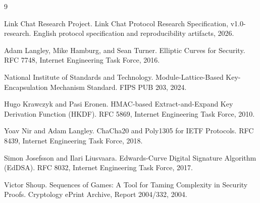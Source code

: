 \documentclass[11pt,letterpaper]{article}
\begin{document}
\begin{thebibliography}{9}

Link Chat Research Project.
\newblock Link Chat Protocol Research Specification, v1.0-research.
\newblock English protocol specification and reproducibility artifacts, 2026.

Adam Langley, Mike Hamburg, and Sean Turner.
\newblock Elliptic Curves for Security.
\newblock RFC 7748, Internet Engineering Task Force, 2016.

National Institute of Standards and Technology.
\newblock Module-Lattice-Based Key-Encapsulation Mechanism Standard.
\newblock FIPS PUB 203, 2024.

Hugo Krawczyk and Pasi Eronen.
\newblock HMAC-based Extract-and-Expand Key Derivation Function (HKDF).
\newblock RFC 5869, Internet Engineering Task Force, 2010.

Yoav Nir and Adam Langley.
\newblock ChaCha20 and Poly1305 for IETF Protocols.
\newblock RFC 8439, Internet Engineering Task Force, 2018.

Simon Josefsson and Ilari Liusvaara.
\newblock Edwards-Curve Digital Signature Algorithm (EdDSA).
\newblock RFC 8032, Internet Engineering Task Force, 2017.

Victor Shoup.
\newblock Sequences of Games: A Tool for Taming Complexity in Security Proofs.
\newblock Cryptology ePrint Archive, Report 2004/332, 2004.

\end{thebibliography}
\end{document}
